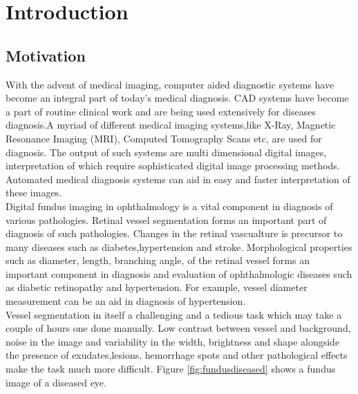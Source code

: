 
\chapter{Introduction}  %

\ifpdf
\graphicspath{{Chapter1/Figs/Raster/}{Chapter1/Figs/PDF/}{Chapter1/Figs/}}
\else
\graphicspath{{Chapter1/Figs/Vector/}{Chapter1/Figs/}}
\fi


\section{Motivation}
With the advent of medical imaging, computer aided diagnostic systems have become an integral part of today's medical diagnosis\cite{doi2007computer}. CAD systems have become a part of routine clinical work and are being used extensively for diseases diagnosis.A myriad of different medical imaging systems,like X-Ray, Magnetic Resonance Imaging (MRI), Computed Tomography Scans etc, are used for diagnosis. The output of such systems are multi dimensional digital images, interpretation of which require sophisticated digital image processing methods. Automated medical diagnosis systems can aid in easy and faster interpretation of these images.\\	

Digital fundus imaging in ophthalmology is a vital component in diagnosis of various pathologies. Retinal vessel segmentation forms an important part of diagnosis of such pathologies. Changes in the retinal vascualture is precursor to many diseases such as diabetes,hypertension and stroke. Morphological properties such as diameter, length, branching angle, of the retinal vessel forms an important component in diagnosis and evaluation of ophthalmologic diseases such as diabetic retinopathy \cite{sinthanayothin2002automated} and hypertension. For example, vessel diameter measurement can be an aid in diagnosis of hypertension\cite{calvo2011automatic}.\\

Vessel segmentation in itself a challenging and a tedious task which may take a couple of hours one done manually. Low contrast between vessel and background, noise in the image and variability in the width, brightness and shape alongside the presence of exudates,lesions, hemorrhage spots and other pathological effects make the task much more difficult. Figure \ref{fig:fundusdiseased} shows a fundus image of a diseased eye.\\


